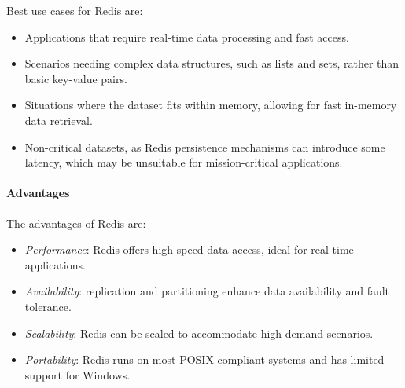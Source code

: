 Best use cases for Redis are: 
\begin{itemize} 
    \item Applications that require real-time data processing and fast access.
    \item Scenarios needing complex data structures, such as lists and sets, rather than basic key-value pairs.
    \item Situations where the dataset fits within memory, allowing for fast in-memory data retrieval.
    \item Non-critical datasets, as Redis persistence mechanisms can introduce some latency, which may be unsuitable for mission-critical applications.
\end{itemize}

\paragraph*{Advantages}
The advantages of Redis are: 
\begin{itemize}
    \item \textit{Performance}: Redis offers high-speed data access, ideal for real-time applications.
    \item \textit{Availability}: replication and partitioning enhance data availability and fault tolerance.
    \item \textit{Scalability}: Redis can be scaled to accommodate high-demand scenarios.
    \item \textit{Portability}: Redis runs on most POSIX-compliant systems and has limited support for Windows.
\end{itemize}

